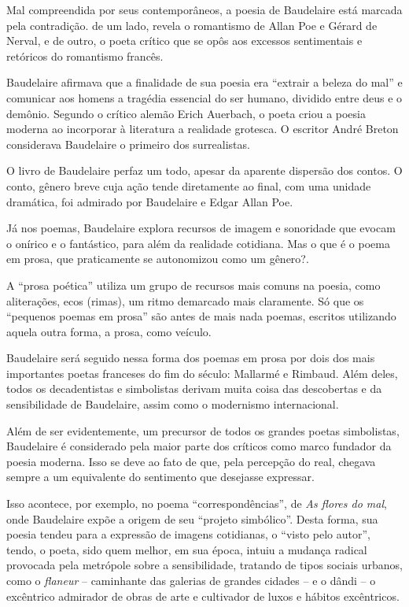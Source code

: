 \documentclass[12pt]{extarticle}
\begin{document}


Mal compreendida por seus contemporâneos, a poesia de Baudelaire está
marcada pela contradição. de um lado, revela o romantismo de Allan Poe e
Gérard de Nerval, e de outro, o poeta crítico que se opôs aos excessos
sentimentais e retóricos do romantismo francês.

Baudelaire afirmava que a finalidade de sua poesia era ``extrair a
beleza do mal'' e comunicar aos homens a tragédia essencial do ser
humano, dividido entre deus e o demônio.
Segundo o crítico alemão Erich Auerbach, o poeta criou a poesia moderna
ao incorporar à literatura a realidade grotesca. O escritor André Breton
considerava Baudelaire o primeiro dos surrealistas.

O livro de Baudelaire perfaz um todo, apesar da aparente dispersão dos
contos.
O conto, gênero breve cuja ação tende diretamente ao final, com uma
unidade dramática, foi admirado por Baudelaire e Edgar Allan Poe.

Já nos poemas, Baudelaire explora recursos de imagem e sonoridade que
evocam o onírico e o fantástico, para além da realidade cotidiana.
Mas o que é o poema em prosa, que praticamente se autonomizou como um
gênero?.

A ``prosa poética'' utiliza um grupo de recursos mais comuns na poesia,
como aliterações, ecos (rimas), um ritmo demarcado mais claramente.
Só que os ``pequenos poemas em prosa'' são antes de mais nada poemas,
escritos utilizando aquela outra forma, a prosa, como veículo.

Baudelaire será seguido nessa forma dos poemas em prosa por dois dos
mais importantes poetas franceses do fim do século: Mallarmé e
Rimbaud.
Além deles, todos os decadentistas e simbolistas derivam muita coisa
das descobertas e da sensibilidade de Baudelaire, assim como o
modernismo internacional.



Além de ser evidentemente, um precursor de todos os grandes poetas
simbolistas, Baudelaire é considerado pela maior parte dos críticos como
marco fundador da poesia moderna. Isso se deve ao fato de que, pela
percepção do real, chegava sempre a um equivalente do
sentimento que desejasse expressar.

Isso acontece, por exemplo, no poema ``correspondências'', de
\emph{As flores do mal}, onde Baudelaire expõe a origem de seu ``projeto simbólico''.
Desta forma, sua poesia tendeu para a expressão de imagens cotidianas, o
``visto pelo autor'', tendo, o poeta, sido quem melhor, em sua época,
intuiu a mudança radical provocada pela
metrópole sobre a
sensibilidade, tratando de tipos sociais urbanos, como o \textit{flaneur} --
caminhante das galerias de grandes cidades -- e o dândi -- o excêntrico
admirador de obras de arte e cultivador de luxos e hábitos excêntricos.
\end{document}
